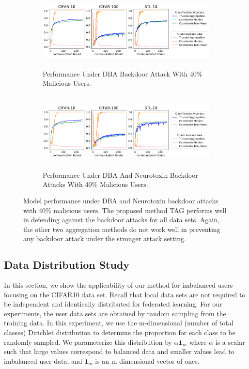 \documentclass{article} %
\begin{document}
\begin{figure}[htp]
\centering
  \begin{subfigure}{\textwidth}
  \centering
    \includegraphics[height=4cm, width=\textwidth]{make_article/make_visuals/visuals/accuracy--n_malicious4--dba1--beta0.2--d_scale.png}
    \caption{\footnotesize Performance Under DBA Backdoor Attack With 40\% Malicious Users.}
  \end{subfigure}%

  \begin{subfigure}{\textwidth}
  \centering
    \includegraphics[height=4cm, width=\textwidth]{make_article/make_visuals/visuals/accuracy--n_malicious4--dba1--beta0.2--d_scale--neuro_p0.1.png}
    \caption{\footnotesize Performance Under DBA And Neurotoxin Backdoor Attacks With 40\% Malicious Users.}
  \end{subfigure}%
\caption{\footnotesize Model performance under DBA and Neurotoxin backdoor attacks with 40\% malicious users. The proposed method TAG performs well in defending against the backdoor attacks for all data sets. Again, the other two aggregation methods do not work well in preventing any backdoor attack under the stronger attack setting.}
\label{fig: accuracy--n_malicious4}
\end{figure}


%
\subsection{Data Distribution Study}

In this section, we show the applicability of our method for imbalanced users focusing on the CIFAR10 data set. Recall that local data sets are not required to be independent and identically distributed for federated learning. For our experiments, the user data sets are obtained by random sampling from the training data. In this experiment, we use the m-dimensional (number of total classes) Dirichlet distribution to determine the proportion for each class to be randomly sampled. We parameterize this distribution by $\alpha \mathbf{1}_m$ where $\alpha$ is a scalar such that large values correspond to balanced data and smaller values lead to imbalanced user data, and $\mathbf{1}_m$ is an m-dimensional vector of ones.
\end{document}
